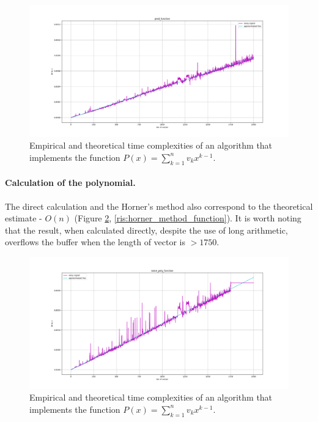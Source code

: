 \begin{figure}[H]
    \center
    \includegraphics[width=\textwidth]{img/prod_function.png}
    \caption{Empirical and theoretical time complexities of an algorithm that implements the function $P(x) = \sum^{n}_{k = 1}{v_kx^{k - 1}}$.}
    \label{ris:prod_function}
\end{figure}

\paragraph{Calculation of the polynomial.}

The direct calculation and the Horner's method also correspond to the theoretical estimate - $O(n)$ (Figure \ref{ris:naive_poly_function}, \ref{ris:horner_method_function}). It is worth noting that the result, when calculated directly, despite the use of long arithmetic, overflows the buffer when the length of vector is $>1750$.

\begin{figure}[H]
    \center
    \includegraphics[width=\textwidth]{img/naive_poly_function.png}
    \caption{Empirical and theoretical time complexities of an algorithm that
implements the function $P(x) = \sum^{n}_{k = 1}{v_kx^{k - 1}}$.}
    \label{ris:naive_poly_function}
\end{figure}

